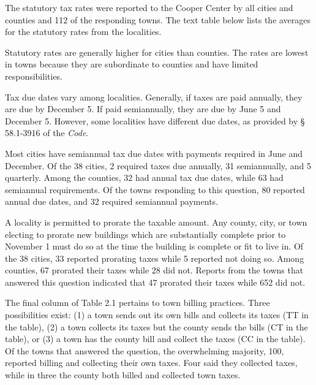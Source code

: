 \documentclass[
]{book}
\newenvironment{Shaded}{\begin{snugshade}}{\end{snugshade}}
\newcommand{\CommentTok}[1]{\textcolor[rgb]{0.56,0.35,0.01}{\textit{#1}}}
\begin{document}
The statutory tax rates were reported to the Cooper Center by all cities and counties and 112 of the responding towns. The text table below lists the averages for the statutory rates from the localities.

\begin{Shaded}
\end{Shaded}

Statutory rates are generally higher for cities than counties. The rates are lowest in towns because they are subordinate to counties and have limited responsibilities.

Tax due dates vary among localities. Generally, if taxes are paid annually, they are due by December 5. If paid semiannually, they are due by June 5 and December 5. However, some localities have different due dates, as provided by § 58.1-3916 of the \emph{Code}.

Most cities have semiannual tax due dates with payments required in June and December. Of the 38 cities, 2 required taxes due annually, 31 semiannually, and 5 quarterly. Among the counties, 32 had annual tax due dates, while 63 had semiannual requirements. Of the towns responding to this question, 80 reported annual due dates, and 32 required semiannual payments.

A locality is permitted to prorate the taxable amount. Any county, city, or town electing to prorate new buildings which are substantially complete prior to November 1 must do so at the time the building is complete or fit to live in. Of the 38 cities, 33 reported prorating taxes while 5 reported not doing so. Among counties, 67 prorated their taxes while 28 did not. Reports from the towns that answered this question indicated that 47 prorated their taxes while 652 did not.

The final column of Table 2.1 pertains to town billing practices. Three possibilities exist: (1) a town sends out its own bills and collects its taxes (TT in the table), (2) a town collects its taxes but the county sends the bills (CT in the
table), or (3) a town has the county bill and collect the taxes (CC in the table). Of the towns that answered the question,
the overwhelming majority, 100, reported billing and collecting their own taxes. Four said they collected taxes, while in three the county both billed and collected town taxes.
\end{document}
